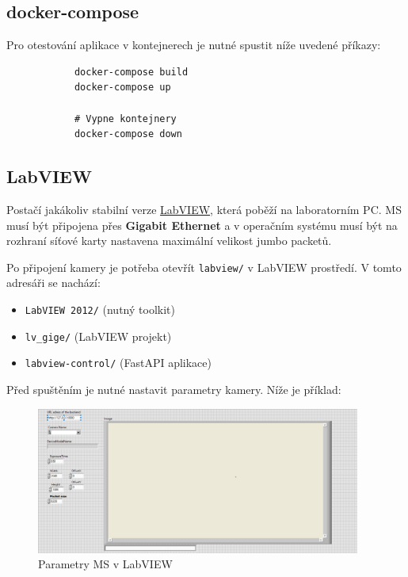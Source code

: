 \documentclass[12pt]{article}
\begin{document}
\begin{teamwork}
        \subsection{docker-compose}\label{subsec:docker-compose}

        Pro otestování aplikace v kontejnerech je nutné spustit níže uvedené příkazy:

        \begin{verbatim}
            docker-compose build
            docker-compose up

            # Vypne kontejnery
            docker-compose down
        \end{verbatim}

        \subsection{LabVIEW}\label{subsec:labview}

        Postačí jakákoliv stabilní verze \href{https://www.ni.com/en/support/downloads/software-products/download.labview.html#559067}{LabVIEW}, která poběží na laboratorním PC\@.
        MS musí být připojena přes \textbf{Gigabit Ethernet} a v operačním systému musí být
        na rozhraní síťové karty nastavena maximální velikost jumbo packetů.

        Po připojení kamery je potřeba otevřít \texttt{labview/} v LabVIEW prostředí.
        V tomto adresáři se nachází:
        \begin{itemize}
            \item \texttt{LabVIEW 2012/} (nutný toolkit)
            \item \texttt{lv\_gige/} (LabVIEW projekt)
            \item \texttt{labview-control/} (FastAPI aplikace)
        \end{itemize}

        Před spuštěním je nutné nastavit parametry kamery.
        Níže je příklad:

        \begin{figure}[hbt!]
            \centering
            \includegraphics[width=0.95\textwidth]{../../img/labview-hyperspectral-cam-settings}
            \caption{Parametry MS v LabVIEW}
            \label{fig:params_ms_labview}
        \end{figure}


\end{teamwork}
\end{document}
